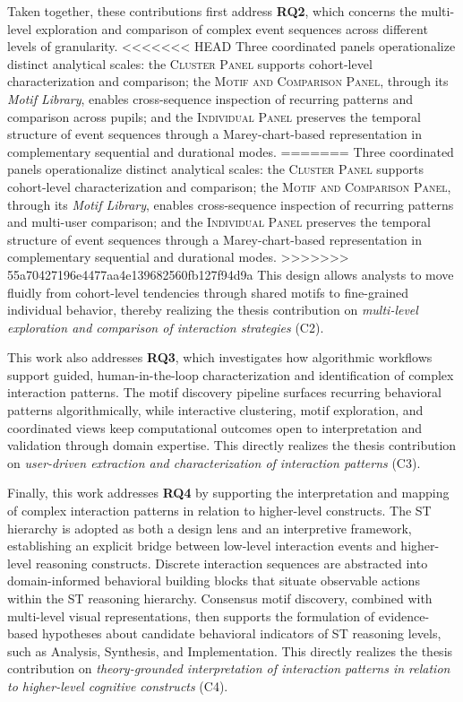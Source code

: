 Taken together, these contributions first address \textbf{RQ2}, which concerns the multi-level exploration and comparison of complex event sequences across different levels of granularity.
<<<<<<< HEAD
Three coordinated panels operationalize distinct analytical scales: the \textsc{Cluster Panel} supports cohort-level characterization and comparison; the \textsc{Motif and Comparison Panel}, through its \textit{Motif Library}, enables cross-sequence inspection of recurring patterns and comparison across pupils; and the \textsc{Individual Panel} preserves the temporal structure of event sequences through a Marey-chart-based representation in complementary sequential and durational modes.
=======
Three coordinated panels operationalize distinct analytical scales: the \textsc{Cluster Panel} supports cohort-level characterization and comparison; the \textsc{Motif and Comparison Panel}, through its \textit{Motif Library}, enables cross-sequence inspection of recurring patterns and multi-user comparison; and the \textsc{Individual Panel} preserves the temporal structure of event sequences through a Marey-chart-based representation in complementary sequential and durational modes.
>>>>>>> 55a70427196e4477aa4e139682560fb127f94d9a
This design allows analysts to move fluidly from cohort-level tendencies through shared motifs to fine-grained individual behavior, thereby realizing the thesis contribution on \textit{multi-level exploration and comparison of interaction strategies} (C2).

This work also addresses \textbf{RQ3}, which investigates how algorithmic workflows support guided, human-in-the-loop characterization and identification of complex interaction patterns.
The motif discovery pipeline surfaces recurring behavioral patterns algorithmically, while interactive clustering, motif exploration, and coordinated views keep computational outcomes open to interpretation and validation through domain expertise.
This directly realizes the thesis contribution on \textit{user-driven extraction and characterization of interaction patterns} (C3).

Finally, this work addresses \textbf{RQ4} by supporting the interpretation and mapping of complex interaction patterns in relation to higher-level constructs.
The ST hierarchy is adopted as both a design lens and an interpretive framework, establishing an explicit bridge between low-level interaction events and higher-level reasoning constructs.
Discrete interaction sequences are abstracted into domain-informed behavioral building blocks that situate observable actions within the ST reasoning hierarchy.
Consensus motif discovery, combined with multi-level visual representations, then supports the formulation of evidence-based hypotheses about candidate behavioral indicators of ST reasoning levels, such as Analysis, Synthesis, and Implementation.
This directly realizes the thesis contribution on \textit{theory-grounded interpretation of interaction patterns in relation to higher-level cognitive constructs} (C4).

